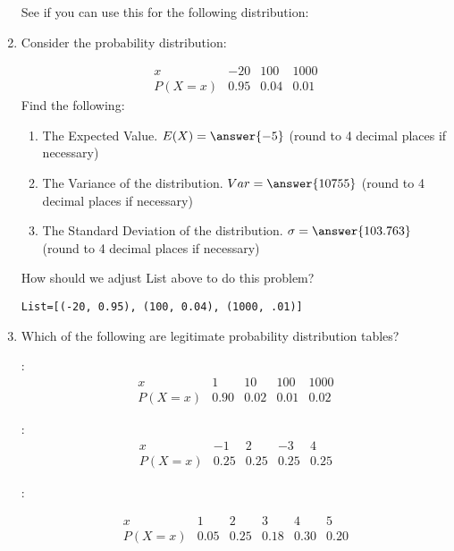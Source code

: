 \documentclass{ximera}
\begin{document}
\begin{enumerate}
See if you can use this for the following distribution:

\item Consider the probability distribution:

$$\begin{array}{c|ccc}
x & -20 &  100 & 1000\\
\hline
P(X=x) & 0.95 & 0.04  & 0.01
\end{array}$$
Find the following:

\begin{enumerate}
\item The Expected Value.  $E(X)=\answer{-5}$ (round to 4 decimal places if necessary)
\item The Variance of the distribution.  $Var=\answer{10755}$ (round to 4 decimal places if necessary)
\item The Standard Deviation of the distribution. $\sigma=\answer{103.763}$  (round to 4 decimal places if necessary)
\end{enumerate}

How should we adjust List above to do this problem?

\begin{hint}
\begin{verbatim}
List=[(-20, 0.95), (100, 0.04), (1000, .01)]
\end{verbatim}
\end{hint}

\item Which of the following are legitimate probability distribution tables?

\begin{selectAll}
\choice[correct]:
$$\begin{array}{c|cccc}
x & 1 & 10 &  100 & 1000\\
\hline
P(X=x) & 0.90 & 0.02  & 0.01 & 0.02
\end{array}$$

\choice[correct]:
$$\begin{array}{c|cccc}
x & -1 & 2 &  -3 & 4\\
\hline
P(X=x) & 0.25 & 0.25  & 0.25 & 0.25
\end{array}$$

\choice:

$$\begin{array}{c|ccccc}
x & 1 & 2 &  3 & 4 & 5\\
\hline
P(X=x) & 0.05 & 0.25  & 0.18 & 0.30 & 0.20
\end{array}$$




\end{selectAll}
\end{enumerate}
\end{document}
